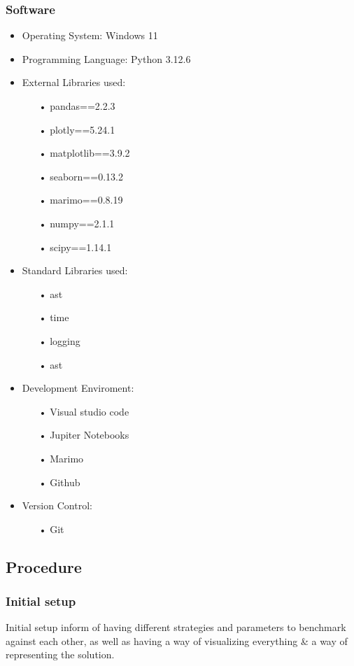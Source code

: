 \documentclass{scrartcl}
\begin{document}
\subsubsection{Software}
\begin{itemize}
    \item Operating System: Windows 11
    \item Programming Language: Python 3.12.6
    \item External Libraries used:
    \begin{itemize}
        \item[•] pandas==2.2.3
        \item[•] plotly==5.24.1
        \item[•] matplotlib==3.9.2
        \item[•] seaborn==0.13.2
        \item[•] marimo==0.8.19
        \item[•] numpy==2.1.1
        \item[•] scipy==1.14.1
    \end{itemize}
    \item Standard Libraries used:
    \begin{itemize}
        \item[•] ast
        \item[•] time
        \item[•] logging
        \item[•] ast
    \end{itemize}
    \item Development Enviroment:
    \begin{itemize}
        \item[•] Visual studio code
        \item[•] Jupiter Notebooks
        \item[•] Marimo
        \item[•] Github
    \end{itemize}
    \item Version Control:
    \begin{itemize}
        \item[•] Git
    \end{itemize}
\end{itemize}
\subsection{Procedure}
\subsubsection{Initial setup}
Initial setup inform of having different strategies and parameters to benchmark against each other, as well as having a way of visualizing everything \& a way of representing the solution.
\end{document}
